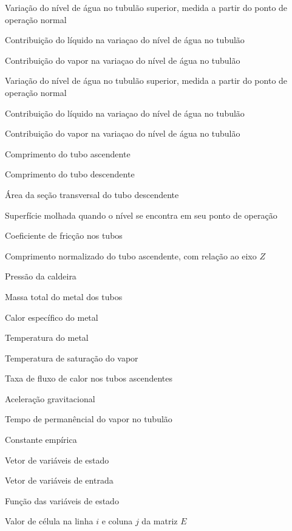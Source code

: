   \item[$ l $] Variação do nível de água no tubulão superior, medida a
  partir do ponto de operação normal
  \item[$ l_w $] Contribuição do líquido na variaçao do nível de água
  no tubulão
  \item[$ l_s $] Contribuição do vapor na variaçao do nível de água no
  tubulão

  \item[$ l_o $] Variação do nível de água no tubulão superior, medida
  a partir do ponto de operação normal
  \item[$ l_{wo} $] Contribuição do líquido na variaçao do nível de
  água no tubulão
  \item[$ l_{so} $] Contribuição do vapor na variaçao do nível de água
  no tubulão


  \item[$ L_r $] Comprimento do tubo ascendente
  \item[$ L_{dc} $] Comprimento do tubo descendente

  \item[$ A_{dc} $] Área da seção transversal do tubo
  descendente \item[$ A_d $] Superfície molhada quando o nível se
  encontra em seu ponto de operação

  \item[$ k $] Coeficiente de fricção nos tubos

  \item[$ \xi $] Comprimento normalizado do tubo ascendente, com
  relação ao eixo $Z$

  \item[$ p $] Pressão da caldeira
  \item[$ m_t $] Massa total do metal dos tubos
  \item[$ C_p $] Calor específico do metal
  \item[$ t_m $] Temperatura do metal
  \item[$ t_s $] Temperatura de saturação do vapor
  \item[$ Q $] Taxa de fluxo de calor nos tubos ascendentes
  \item[$ g $] Aceleração gravitacional
  \item[$ T_d $] Tempo de permanêncial do vapor no tubulão
  \item[$ \beta $] Constante empírica

  \item[$ X $] Vetor de variáveis de estado
  \item[$ U $] Vetor de variáveis de entrada
  \item[$ E $] Função das variáveis de estado
  \item[$ e_{ij} $] Valor de célula na linha $i$ e coluna $j$ da
  matriz $E$


